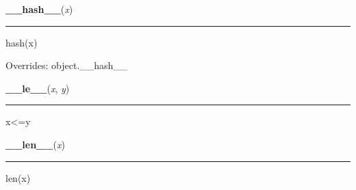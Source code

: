     \vspace{0.5ex}

\hspace{.8\funcindent}\begin{boxedminipage}{\funcwidth}

    \raggedright \textbf{\_\_hash\_\_}(\textit{x})

    \vspace{-1.5ex}

    \rule{\textwidth}{0.5\fboxrule}
\setlength{\parskip}{2ex}
    hash(x)

\setlength{\parskip}{1ex}
      Overrides: object.\_\_hash\_\_

    \end{boxedminipage}

    \label{resource:struct_rusage:__le__}

    \vspace{0.5ex}

\hspace{.8\funcindent}\begin{boxedminipage}{\funcwidth}

    \raggedright \textbf{\_\_le\_\_}(\textit{x}, \textit{y})

    \vspace{-1.5ex}

    \rule{\textwidth}{0.5\fboxrule}
\setlength{\parskip}{2ex}
    x{\textless}=y

\setlength{\parskip}{1ex}
    \end{boxedminipage}

    \label{resource:struct_rusage:__len__}

    \vspace{0.5ex}

\hspace{.8\funcindent}\begin{boxedminipage}{\funcwidth}

    \raggedright \textbf{\_\_len\_\_}(\textit{x})

    \vspace{-1.5ex}

    \rule{\textwidth}{0.5\fboxrule}
\setlength{\parskip}{2ex}
    len(x)

\setlength{\parskip}{1ex}
    \end{boxedminipage}

    \label{resource:struct_rusage:__lt__}


